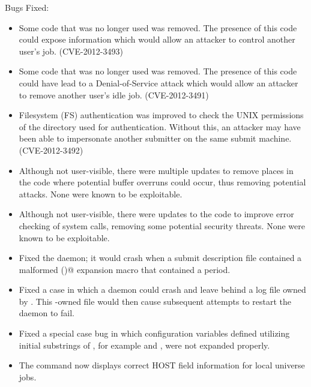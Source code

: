 \noindent Bugs Fixed:

\begin{itemize}

\item \Security Some code that was no longer used was removed.  The presence
of this code could expose information which would allow an attacker to control
another user's job.  (CVE-2012-3493)

\item \Security Some code that was no longer used was removed.  The presence
of this code could have lead to a Denial-of-Service attack which would allow
an attacker to remove another user's idle job.  (CVE-2012-3491)

\item \Security Filesystem (FS) authentication was improved to check the UNIX
permissions of the directory used for authentication.  Without this, an
attacker may have been able to impersonate another submitter on the same submit
machine.  (CVE-2012-3492)

\item \Security Although not user-visible, there were multiple updates to
remove places in the code where potential buffer overruns could occur, thus
removing potential attacks.  None were known to be exploitable.

\item \Security Although not user-visible, there were updates to the code to
improve error checking of system calls, removing some potential security
threats.  None were known to be exploitable.




\item Fixed the  daemon; 
it would crash when a submit description file
contained a malformed \verb@$$()@ expansion macro that contained
a period.

\item Fixed a case in which a daemon could crash and leave behind a log
file owned by .  This -owned file would then cause
subsequent attempts to restart the daemon to fail.

\item Fixed a special case bug in which configuration variables
defined utilizing initial substrings of ,
for example   and  ,  
were not expanded properly.

\item The command   now displays correct HOST field 
information for local universe jobs.

\end{itemize}

